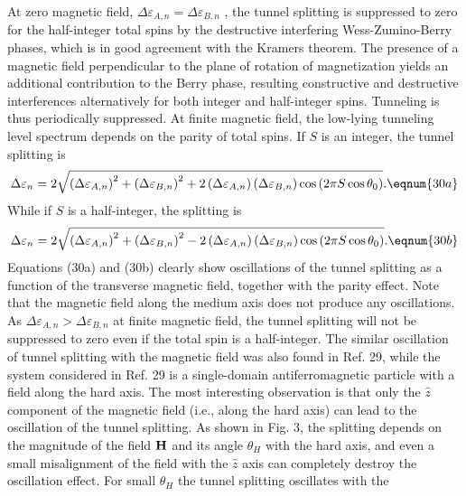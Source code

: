 At zero magnetic field, $\Delta \varepsilon _{A,n}=\Delta \varepsilon _{B,n}$%
, the tunnel splitting is suppressed to zero for the half-integer total
spins by the destructive interfering Wess-Zumino-Berry phases, which is in
good agreement with the Kramers theorem. The presence of a magnetic field
perpendicular to the plane of rotation of magnetization yields an additional
contribution to the Berry phase, resulting constructive and destructive
interferences alternatively for both integer and half-integer spins.
Tunneling is thus periodically suppressed. At finite magnetic field, the
low-lying tunneling level spectrum depends on the parity of total spins. If $%
S$ is an integer, the tunnel splitting is 
\begin{equation}
\Delta \varepsilon _n=2\sqrt{\left( \Delta \varepsilon _{A,n}\right)
^2+\left( \Delta \varepsilon _{B,n}\right) ^2+2\left( \Delta \varepsilon
_{A,n}\right) \left( \Delta \varepsilon _{B,n}\right) \cos \left( 2\pi S\cos
\theta _0\right) }.  \eqnum{30a}
\end{equation}
While if $S$ is a half-integer, the splitting is 
\begin{equation}
\Delta \varepsilon _n=2\sqrt{\left( \Delta \varepsilon _{A,n}\right)
^2+\left( \Delta \varepsilon _{B,n}\right) ^2-2\left( \Delta \varepsilon
_{A,n}\right) \left( \Delta \varepsilon _{B,n}\right) \cos \left( 2\pi S\cos
\theta _0\right) }.  \eqnum{30b}
\end{equation}
Equations (30a) and (30b) clearly show oscillations of the tunnel splitting
as a function of the transverse magnetic field, together with the parity
effect. Note that the magnetic field along the medium axis does not produce
any oscillations. As $\Delta \varepsilon _{A,n}>\Delta \varepsilon _{B,n}$
at finite magnetic field, the tunnel splitting will not be suppressed to
zero even if the total spin is a half-integer. The similar oscillation of
tunnel splitting with the magnetic field was also found in Ref. 29, while
the system considered in Ref. 29 is a single-domain antiferromagnetic
particle with a field along the hard axis. The most interesting observation
is that only the $\widehat{z}$ component of the magnetic field (i.e., along
the hard axis) can lead to the oscillation of the tunnel splitting. As shown
in Fig. 3, the splitting depends on the magnitude of the field ${\bf H}$ and
its angle $\theta _H$ with the hard axis, and even a small misalignment of
the field with the $\widehat{z}$ axis can completely destroy the oscillation
effect. For small $\theta _H$ the tunnel splitting oscillates with the

